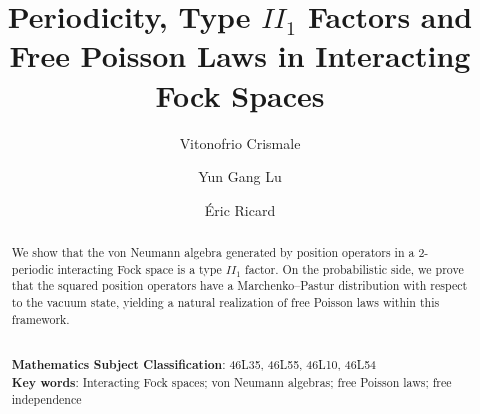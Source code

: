 \documentclass[12pt]{amsart}
\numberwithin{equation}{section}
\theoremstyle{definition}
\begin{document}
\title[Periodicity, Type $II_1$ Factors and Free Poisson Laws]
{Periodicity, Type $II_1$ Factors and Free Poisson Laws in Interacting Fock Spaces}
 



\author{Vitonofrio Crismale}
\address{Vitonofrio Crismale\\
Dipartimento di Matematica\\
Universit\`{a} degli studi di Bari\\
Via E. Orabona, 4, 70125 Bari, Italy}

\author{Yun Gang Lu}
\address{Yun Gang Lu\\
Dipartimento di Matematica\\
Universit\`{a} degli studi di Bari\\
Via E. Orabona, 4, 70125 Bari, Italy}

\author{\'Eric Ricard}
\address{\'Eric Ricard\\
UNICAEN, CNRS, LMNO\\ 14000 Caen, France}





\begin{abstract}
We show that the von Neumann algebra generated by position operators in a 2-periodic interacting Fock space is a type $II_1$ factor. 
On the probabilistic side, we prove that the squared position operators have a Marchenko--Pastur distribution with respect to the vacuum state, yielding a natural realization of free Poisson laws within this framework. 

\vskip0.1cm\noindent \\
{\bf Mathematics Subject Classification}: 46L35, 46L55, 46L10, 46L54  \\
{\bf Key words}: Interacting Fock spaces; von Neumann algebras;
free Poisson laws; free independence
\end{abstract}


\maketitle
\end{document}
